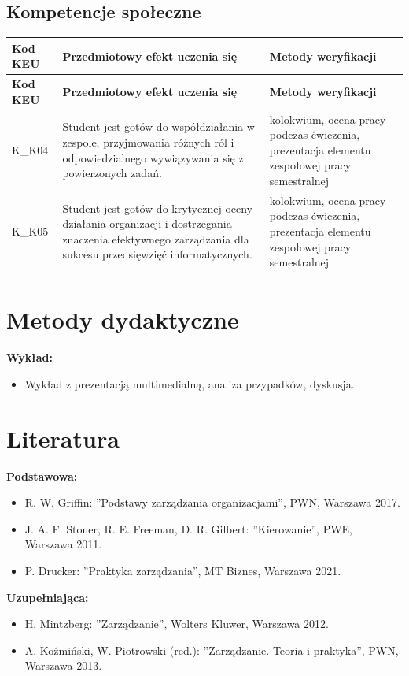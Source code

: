 \documentclass[12pt, a4paper]{article}
\newcommand{\thdrule}{\noalign{\global\setlength{\extrarowheight}{0pt}}}
\newcommand{\thdend}{\noalign{\global\setlength{\extrarowheight}{3pt}}}
\begin{document}
\subsection*{Kompetencje społeczne}
{\scriptsize
\begin{longtable}{m{1.6cm}m{9.0cm}m{4.2cm}}
\thdrule\toprule
\rowcolor{pjatkRed} {\color{white}\footnotesize\textbf{\vphantom{Ag}Kod KEU}} & {\color{white}\footnotesize\textbf{\vphantom{Ag}Przedmiotowy efekt uczenia się}} & {\color{white}\footnotesize\textbf{\vphantom{Ag}Metody weryfikacji}} \\
\midrule\thdend
\endfirsthead
\thdrule\toprule
\rowcolor{pjatkRed} {\color{white}\footnotesize\textbf{\vphantom{Ag}Kod KEU}} & {\color{white}\footnotesize\textbf{\vphantom{Ag}Przedmiotowy efekt uczenia się}} & {\color{white}\footnotesize\textbf{\vphantom{Ag}Metody weryfikacji}} \\
\midrule\thdend
\endhead
  \rowcolor{tableRowLight} K\_K04 & Student jest gotów do współdziałania w zespole, przyjmowania różnych ról i odpowiedzialnego wywiązywania się z powierzonych zadań. & kolokwium, ocena pracy podczas ćwiczenia, prezentacja elementu zespołowej pracy semestralnej \\
  \rowcolor{tableRowAlt} K\_K05 & Student jest gotów do krytycznej oceny działania organizacji i dostrzegania znaczenia efektywnego zarządzania dla sukcesu przedsięwzięć informatycznych. & kolokwium, ocena pracy podczas ćwiczenia, prezentacja elementu zespołowej pracy semestralnej \\
\bottomrule
\end{longtable}}

\section{Metody dydaktyczne}

\textbf{Wykład:}
\begin{itemize}
  \item Wykład z prezentacją multimedialną, analiza przypadków, dyskusja.
\end{itemize}
\vspace{4pt}


\section{Literatura}

\textbf{Podstawowa:}
\begin{itemize}
  \item R. W. Griffin: ''Podstawy zarządzania organizacjami'', PWN, Warszawa 2017.
  \item J. A. F. Stoner, R. E. Freeman, D. R. Gilbert: ''Kierowanie'', PWE, Warszawa 2011.
  \item P. Drucker: ''Praktyka zarządzania'', MT Biznes, Warszawa 2021.
\end{itemize}

\textbf{Uzupełniająca:}
\begin{itemize}
  \item H. Mintzberg: ''Zarządzanie'', Wolters Kluwer, Warszawa 2012.
  \item A. Koźmiński, W. Piotrowski (red.): ''Zarządzanie. Teoria i praktyka'', PWN, Warszawa 2013.
\end{itemize}
\end{document}
